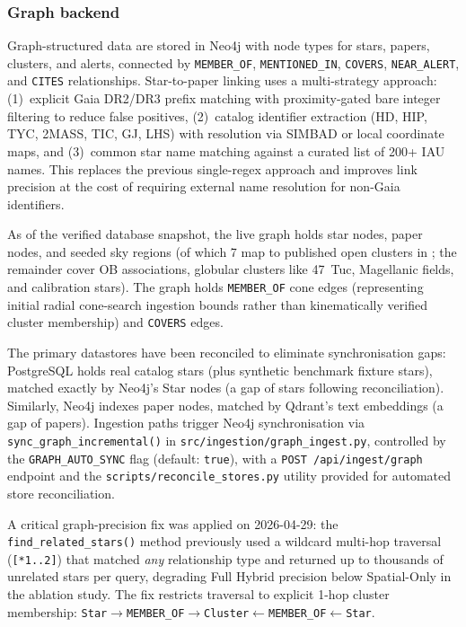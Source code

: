 \documentclass[preprint,12pt,authoryear]{elsarticle}
\begin{document}
\subsubsection{Graph backend}
Graph-structured data are stored in Neo4j \citep{Robinson2015} with node types for stars, papers, clusters, and alerts, connected by \texttt{MEMBER\_OF}, \texttt{MENTIONED\_IN}, \texttt{COVERS}, \texttt{NEAR\_ALERT}, and \texttt{CITES} relationships. Star-to-paper linking uses a multi-strategy approach: (1)~explicit Gaia DR2/DR3 prefix matching with proximity-gated bare integer filtering to reduce false positives, (2)~catalog identifier extraction (HD, HIP, TYC, 2MASS, TIC, GJ, LHS) with resolution via SIMBAD or local coordinate maps, and (3)~common star name matching against a curated list of 200+ IAU names. This replaces the previous single-regex approach and improves link precision at the cost of requiring external name resolution for non-Gaia identifiers.

As of the verified database snapshot, the live graph holds \textbf{\nStarNodes{}} star nodes, \textbf{\nPaperNodes{}} paper nodes, and \textbf{\nClusterNodes{}} seeded sky regions (of which 7 map to published open clusters in \cite{Hunt2023}; the remainder cover OB associations, globular clusters like 47~Tuc, Magellanic fields, and calibration stars). The graph holds \textbf{\nMemberOfEdges{}} \texttt{MEMBER\_OF} cone edges (representing initial radial cone-search ingestion bounds rather than kinematically verified cluster membership) and \textbf{\nCoversEdges{}} \texttt{COVERS} edges.

The primary datastores have been reconciled to eliminate synchronisation gaps: PostgreSQL holds \nStarsReal{} real catalog stars (plus \nStarsSynthetic{} synthetic benchmark fixture stars), matched exactly by Neo4j's \nStarNodes{} Star nodes (a gap of \nStoreStarGap{} stars following reconciliation). Similarly, Neo4j indexes \nPaperNodes{} paper nodes, matched by Qdrant's \nPapersQdrant{} text embeddings (a gap of \nStorePaperGap{} papers). Ingestion paths trigger Neo4j synchronisation via \texttt{sync\_graph\_incremental()} in \texttt{src/ingestion/graph\_ingest.py}, controlled by the \texttt{GRAPH\_AUTO\_SYNC} flag (default: \texttt{true}), with a \texttt{POST /api/ingest/graph} endpoint and the \texttt{scripts/reconcile\_stores.py} utility provided for automated store reconciliation.

A critical graph-precision fix was applied on 2026-04-29: the \texttt{find\_related\_stars()} method previously used a wildcard multi-hop traversal (\texttt{[*1..2]}) that matched \emph{any} relationship type and returned up to thousands of unrelated stars per query, degrading Full Hybrid precision below Spatial-Only in the ablation study. The fix restricts traversal to explicit 1-hop cluster membership: \texttt{Star}${\to}$\texttt{MEMBER\allowbreak\_OF}${\to}$\texttt{Cluster}${\leftarrow}$\texttt{MEMBER\allowbreak\_OF}${\leftarrow}$\texttt{Star}.
\end{document}
